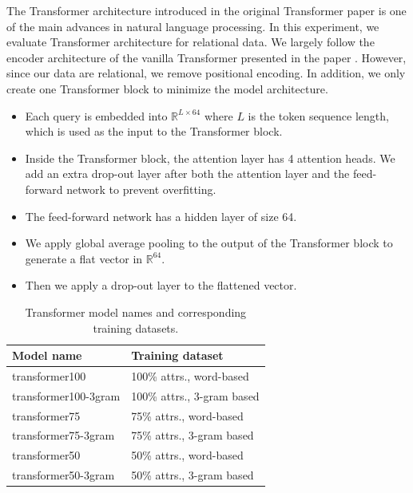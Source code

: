 \documentclass[conference]{IEEEtran}
\begin{document}

The Transformer architecture introduced in the original Transformer paper \cite{DBLP:journals/corr/VaswaniSPUJGKP17} is one of the main advances in natural language processing. In this experiment, we evaluate Transformer architecture for relational data. We largely follow the encoder architecture of the vanilla Transformer presented in the paper \cite{DBLP:journals/corr/VaswaniSPUJGKP17}. However, since our data are relational, we remove positional encoding. In addition, we only create one Transformer block to minimize the model architecture.


\begin{itemize}
	\item Each query is embedded into $\mathbb{R}^{L\times 64}$ where $L$ is the token sequence length, which is used as the input to the Transformer block.
	\item Inside the Transformer block, the attention layer has 4 attention heads. We add an extra drop-out layer after both the attention layer and the feed-forward network to prevent overfitting.
	\item The feed-forward network has a hidden layer of size 64.
	\item We apply global average pooling to the output of the Transformer block to generate a flat vector in $\mathbb{R}^{64}$.
        \item Then we apply a drop-out layer to the flattened vector.
\end{itemize}

\begin{table}[!th]
	\centering
	\begin{tabularx}{0.8\textwidth}{|l|X|}
		\hline
		\textbf{Model name} & \textbf{Training dataset} \\ \hline
		transformer100 & 100\% attrs., word-based \\
		transformer100-3gram & 100\% attrs., 3-gram based \\ 
		transformer75 & 75\% attrs., word-based \\
		transformer75-3gram & 75\% attrs., 3-gram based \\ 
		transformer50 & 50\% attrs., word-based \\
		transformer50-3gram & 50\% attrs., 3-gram based \\ 
		\hline
	\end{tabularx}
	\caption{Transformer model names and corresponding training datasets.}
	\label{tab:trained_transformer_models}
\end{table}
\end{document}

